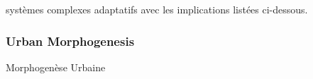 {systèmes complexes adaptatifs avec les implications listées ci-dessous.
}





\subsubsection{Urban Morphogenesis}{Morphogenèse Urbaine}







